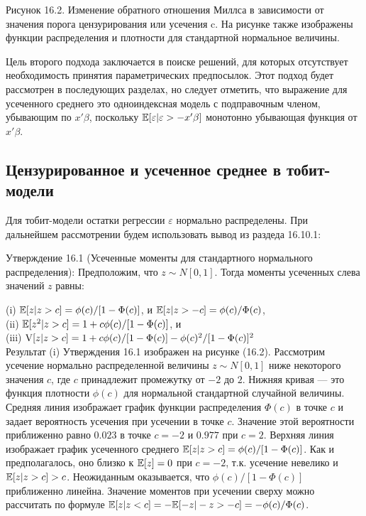 Рисунок 16.2. Изменение обратного отношения Миллса в зависимости от значения порога цензурирования или усечения c. На рисунке также изображены функции распределения и плотности для стандартной нормальное величины.



Цель второго подхода заключается в поиске решений, для которых отсутствует необходимость принятия параметрических предпосылок. Этот подход будет рассмотрен в последующих разделах, но следует отметить, что выражение для усеченного среднего это одноиндексная модель с подправочным членом, убывающим по $x'\beta$, поскольку $\mathbb{E}[\varepsilon|\varepsilon>-x'\beta]$ монотонно убывающая функция от $x'\beta$.

\subsection{Цензурированное и усеченное среднее в тобит-модели}

Для тобит-модели остатки регрессии $\varepsilon$ нормально распределены. При дальнейшем рассмотрении будем использовать вывод из раздеда 16.10.1:

Утверждение 16.1 (Усеченные моменты для стандартного нормального распределения): Предположим, что $z \sim N[0,1]$. Тогда моменты усеченных слева значений $z$ равны:


(i) $\mathbb{E}[z|z>c]=\phi(c)/[1-\Phi(c)]$, и $\mathbb{E}[z|z>-c]=\phi(c)/\Phi(c)$,\\
(ii) $\mathbb{E}[z^{2}|z>c]=1+c\phi(c)/[1-\Phi(c)]$, и \\
(iii) $\mathrm{V}[z|z>c]=1+c\phi(c)/[1-\Phi(c)]-\phi(c)^{2}/[1-\Phi(c)]^{2}$ \\

Результат (i) Утверждения 16.1 изображен на рисунке (16.2). Рассмотрим усечение нормально распределенной величины $z \sim N[0,1]$ ниже некоторого значения $c$, где $c$ принадлежит промежутку от $-2$ до $2$. Нижняя кривая --- это функция плотности $\phi(c)$ для нормальной стандартной случайной величины. Средняя линия изображает график функции распределения $\Phi(c)$ в точке $c$ и задает вероятность усечения при усечении в точке $c$. Значение этой вероятности приближенно равно $0.023$ в точке $c=-2$ и $0.977$ при $c=2$. Верхняя линия изображает график усеченного среднего $\mathbb{E}[z|z>c]=\phi(c)/[1-\Phi(c)]$. Как и предполагалось, оно близко к  $\mathbb{E}[z]=0$  при $c=-2$, т.к. усечение невелико и $\mathbb{E}[z|z>c]>c$. Неожиданным оказывается, что $\phi(c)/[1-\Phi(c)]$ приближенно линейна. Значение моментов при усечении сверху можно рассчитать по формуле $\mathbb{E}[z|z<c]=-\mathbb{E}[-z|-z>-c]=-\phi(c)/\Phi(c)$. 

